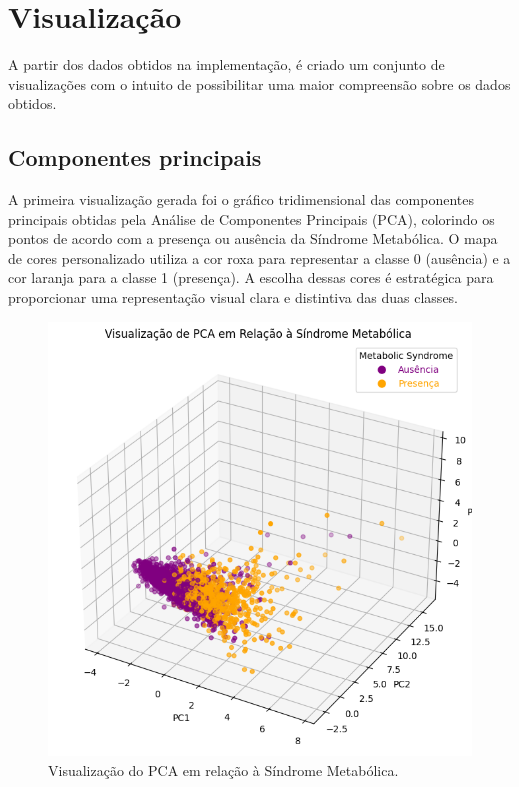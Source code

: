 \documentclass[12pt, a4paper]{article}
\begin{document}
\section{Visualização}
A partir dos dados obtidos na implementação, é criado um conjunto de visualizações com o intuito de possibilitar uma maior compreensão sobre os dados obtidos.\\
\subsection{Componentes principais}
\par A primeira visualização gerada foi o gráfico tridimensional das componentes principais obtidas pela Análise de Componentes Principais (PCA), colorindo os pontos de acordo com a presença ou ausência da Síndrome Metabólica. O mapa de cores personalizado utiliza a cor roxa para representar a classe 0 (ausência) e a cor laranja para a classe 1 (presença). A escolha dessas cores é estratégica para proporcionar uma representação visual clara e distintiva das duas classes.
\begin{figure}[htbp]
    \centering
    \includegraphics[scale=0.5]{img/pca_3d.png}
    \caption{Visualização do PCA em relação à Síndrome Metabólica.}
\end{figure}
\break
\end{document}
